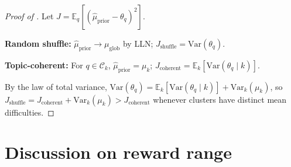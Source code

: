 \documentclass{article}
\theoremstyle{plain}
\theoremstyle{definition}
\theoremstyle{remark}
\begin{document}
\begin{proof}[Proof of ]
Let $J=\mathbb{E}_q[(\hat{\mu}_{\text{prior}}-\theta_q)^2]$.

\textbf{Random shuffle:} $\hat{\mu}_{\text{prior}}\to\mu_{\text{glob}}$ by LLN; $J_{\text{shuffle}}=\text{Var}(\theta_q)$.

\textbf{Topic-coherent:} For $q\in\mathcal{C}_k$, $\hat{\mu}_{\text{prior}}=\mu_k$; $J_{\text{coherent}}=\mathbb{E}_k[\text{Var}(\theta_q\mid k)]$.

By the law of total variance, $\text{Var}(\theta_q)=\mathbb{E}_k[\text{Var}(\theta_q\mid k)]+\text{Var}_k(\mu_k)$, so $J_{\text{shuffle}}=J_{\text{coherent}}+\text{Var}_k(\mu_k)>J_{\text{coherent}}$ whenever clusters have distinct mean difficulties.
\end{proof}
\fi

\section{Discussion on reward range}
\label{sec:discussion}


\end{document}
